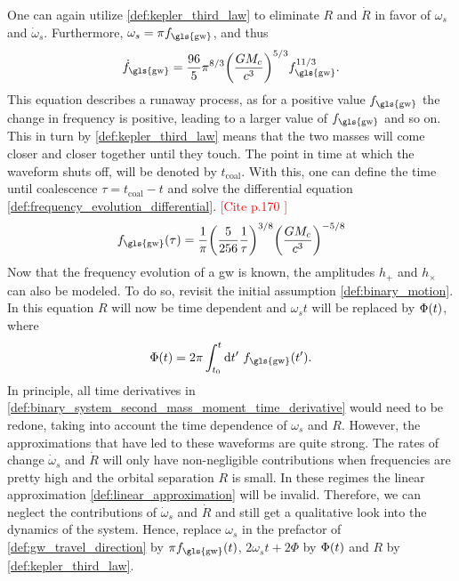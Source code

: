 One can again utilize \eqref{def:kepler_third_law} to eliminate $R$ and $\dot{R}$ in favor of $\omega_s$ and $\dot{\omega}_s$. Furthermore, $\omega_s = \pi f_\text{\gls{gw}}$, and thus
\begin{equation}\label{def:frequency_evolution_differential}
\dot{f}_\text{\gls{gw}}=\frac{96}{5}\pi^{8/3}\lr{\frac{G M_c}{c^3}}^{5/3}f_\text{\gls{gw}}^{11/3}.
\end{equation}
This equation describes a runaway process, as for a positive value $f_\text{\gls{gw}}$ the change in frequency is positive, leading to a larger value of $f_\text{\gls{gw}}$ and so on. This in turn by \eqref{def:kepler_third_law} means that the two masses will come closer and closer together until they touch. The point in time at which the waveform shuts off, will be denoted by $t_\text{coal}$. With this, one can define the time until coalescence $\tau=t_\text{coal}-t$ and solve the differential equation \eqref{def:frequency_evolution_differential}. \textcolor{red}{[Cite p.170 \cite{gwv1}]}
\begin{equation}\label{def:frequency evolution}
f_\text{\gls{gw}}\lr{\tau} = \frac{1}{\pi}\lr{\frac{5}{256}\frac{1}{\tau}}^{3/8}\lr{\frac{G M_c}{c^3}}^{-5/8}
\end{equation}
Now that the frequency evolution of a \gls{gw} is known, the amplitudes $h_+$ and $h_\times$ can also be modeled. To do so, revisit the initial assumption \eqref{def:binary_motion}. In this equation $R$ will now be time dependent and $\omega_s t$ will be replaced by $\Phi{\left( t \right)}$, where
\begin{equation}\label{def:phase_equation}
\Phi\lr{t} = 2\pi \int_{t_0}^t\diff t'\ f_\text{\gls{gw}}\lr{t'}.
\end{equation}
In principle, all time derivatives in \eqref{def:binary_system_second_mass_moment_time_derivative} would need to be redone, taking into account the time dependence of $\omega_s$ and $R$. However, the approximations that have led to these waveforms are quite strong. The rates of change $\dot{\omega}_s$ and $\dot{R}$ will only have non-negligible contributions when frequencies are pretty high and the orbital separation $R$ is small. In these regimes the linear approximation \eqref{def:linear_approximation} will be invalid. Therefore, we can neglect the contributions of $\dot{\omega}_s$ and $\dot{R}$ and still get a qualitative look into the dynamics of the system. Hence, replace $\omega_s$ in the prefactor of \eqref{def:gw_travel_direction} by $\pi f_\text{\gls{gw}}\lr{t}$, $2\omega_s t + 2 \Phi$ by $\Phi{\left( t \right)}$ and $R$ by \eqref{def:kepler_third_law}.\\
